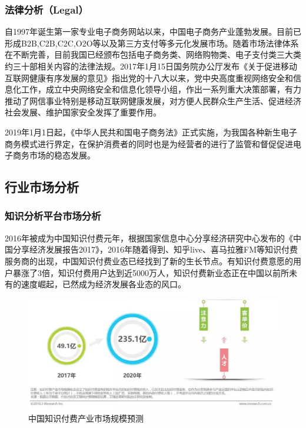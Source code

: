 \documentclass[UTF8,12pt]{ctexart}
\numberwithin{figure}{section}%
\begin{document}
\begin{spacing}{2}
\subsubsection{法律分析（Legal）}
自1997年诞生第一家专业电子商务网站以来，中国电子商务产业蓬勃发展。目前已形成B2B,C2B,C2C,O2O等以及第三方支付等多元化发展市场。随着市场法律体系在不断完善，目前我国已经颁布包括电子商务类、网络购物类、电子支付类三大类约三十部相关内容的法律法规。2017年1月15日国务院办公厅发布《关于促进移动互联网健康有序发展的意见》指出党的十八大以来，党中央高度重视网络安全和信息化工作，成立中央网络安全和信息化领导小组，作出一系列重大决策部署，有力推动了网信事业特别是移动互联网健康发展，对方便人民群众生产生活、促进经济社会发展、维护国家安全发挥了重要作用。

2019年1月1日起，《中华人民共和国电子商务法》正式实施，为我国各种新生电子商务模式进行界定，在保护消费者的同时也是为经营者的进行了监管和督促促进电子商务市场的稳态发展。

\subsection{行业市场分析}
\subsubsection{知识分析平台市场分析}
2016年被成为中国知识付费元年，根据国家信息中心分享经济研究中心发布的《中国分享经济发展报告2017》，2016年随着得到、知乎live、喜马拉雅FM等知识付费服务商的出现，中国知识付费业态已经找到了新的生长节点。有知识付费意愿的用户暴涨了3倍，知识付费用户达到近5000万人，知识付费新业态正在中国以前所未有的速度崛起，已然成为经济发展各业态的风口。

\begin{figure}[!htb]
	\centering
	\includegraphics[width=13cm]{fig/6}
	\caption{中国知识付费产业市场规模预测}
\end{figure}




\end{spacing}
\end{document}

